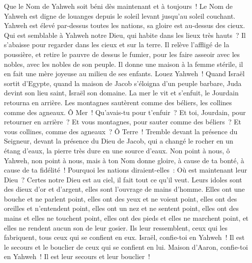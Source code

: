 \begin{multicols}{2}
Que le Nom de Yahweh soit béni dès maintenant et à toujours~!
Le Nom de Yahweh est digne de louanges depuis le soleil levant jusqu'au soleil couchant.
Yahweh est élevé par-dessus toutes les nations, sa gloire est au-dessus des cieux.
Qui est semblable à Yahweh notre Dieu, qui habite dans les lieux très hauts~?
Il s'abaisse pour regarder dans les cieux et sur la terre.
Il relève l'affligé de la poussière, et retire le pauvre de dessus le fumier,
pour les faire asseoir avec les nobles, avec les nobles de son peuple.
Il donne une maison à la femme stérile, il en fait une mère joyeuse au milieu de ses enfants. Louez Yahweh~!
\VerseOne{}Quand Israël sortit d'Egypte, quand la maison de Jacob s'éloigna d'un peuple barbare,
Juda devint son lieu saint, Israël son domaine.
La mer le vit et s'enfuit, le Jourdain retourna en arrière.
Les montagnes sautèrent comme des béliers, les collines comme des agneaux.
Ô Mer~! Qu'avais-tu pour t'enfuir~? Et toi, Jourdain, pour retourner en arrière~?
Et vous montagnes, pour sauter comme des béliers~? Et vous collines, comme des agneaux~?
Ô Terre~! Tremble devant la présence du Seigneur, devant la présence du Dieu de Jacob,
qui a changé le rocher en un étang d'eaux, la pierre très dure en une source d'eaux.
\VerseOne{}Non point à nous, ô Yahweh, non point à nous, mais à ton Nom donne gloire, à cause de ta bonté, à cause de ta fidélité~!
Pourquoi les nations diraient-elles~: Où est maintenant leur Dieu~?
Certes notre Dieu est au ciel, il fait tout ce qu'il veut.
Leurs idoles sont des dieux d'or et d'argent, elles sont l'ouvrage de mains d'homme.
Elles ont une bouche et ne parlent point, elles ont des yeux et ne voient point,
elles ont des oreilles et n'entendent point, elles ont un nez et ne sentent point,
elles ont des mains et elles ne touchent point, elles ont des pieds et elles ne marchent point, et elles ne rendent aucun son de leur gosier.
Ils leur ressemblent, ceux qui les fabriquent, tous ceux qui se confient en eux.
Israël, confie-toi en Yahweh~! Il est le secours et le bouclier de ceux qui se confient en lui.
Maison d'Aaron, confie-toi en Yahweh~! Il est leur secours et leur bouclier~!

\end{multicols}
